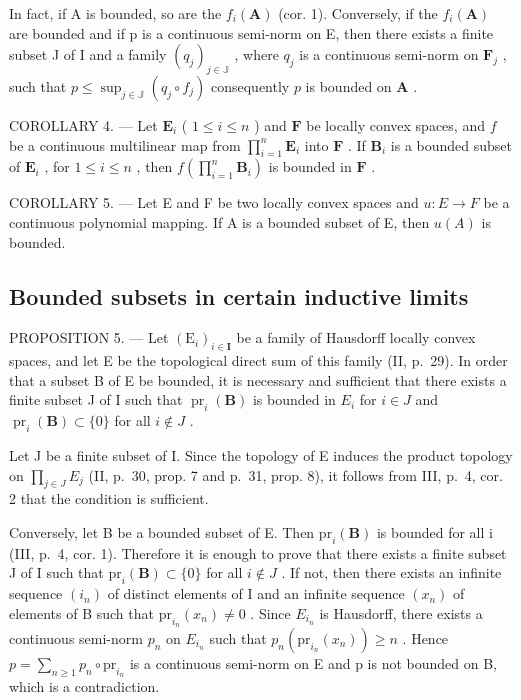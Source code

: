 In fact, if A is bounded, so are the \(f_{i}(\mathbf{A})\) (cor. 1). Conversely, if the \(f_{i}(\mathbf{A})\) are bounded and if p is a continuous semi-norm on E, then there exists a finite subset J of I and a family \((q_{j})_{j\in \mathbb{J}}\) , where \(q_{j}\) is a continuous semi-norm on \(\mathbf{F}_j\) , such that \(p\leqslant \sup_{j\in \mathbb{J}}(q_j\circ f_j)\) consequently \(p\) is bounded on \(\mathbf{A}\) .

COROLLARY 4. --- Let \(\mathbf{E}_i\) ( \(1 \leqslant i \leqslant n\) ) and \(\mathbf{F}\) be locally convex spaces, and \(f\) be a continuous multilinear map from \(\prod_{i=1}^{n} \mathbf{E}_i\) into \(\mathbf{F}\) . If \(\mathbf{B}_i\) is a bounded subset of \(\mathbf{E}_i\) , for \(1 \leqslant i \leqslant n\) , then \(f\left(\prod_{i=1}^{n} \mathbf{B}_i\right)\) is bounded in \(\mathbf{F}\) .

COROLLARY 5. --- Let E and F be two locally convex spaces and \(u:E\to F\) be a continuous polynomial mapping. If A is a bounded subset of E, then \(u(A)\) is bounded.

\subsection{Bounded subsets in certain inductive limits}

PROPOSITION 5. --- Let \((\mathrm{E}_{i})_{i\in\mathbf{I}}\) be a family of Hausdorff locally convex spaces, and let E be the topological direct sum of this family (II, p.~29). In order that a subset B of E be bounded, it is necessary and sufficient that there exists a finite subset J of I such that \(\operatorname{pr}_{i}(\mathbf{B})\) is bounded in \(E_{i}\) for \(i\in J\) and \(\operatorname{pr}_{i}(\mathbf{B})\subset\{0\}\) for all \(i\notin J\) .

Let J be a finite subset of I. Since the topology of E induces the product topology on \(\prod_{j\in J}E_{j}\) (II, p.~30, prop. 7 and p.~31, prop. 8), it follows from III, p.~4, cor. 2 that the condition is sufficient.

Conversely, let B be a bounded subset of E. Then \(\mathrm{pr}_{i}(\mathbf{B})\) is bounded for all i (III, p.~4, cor. 1). Therefore it is enough to prove that there exists a finite subset J of I such that \(\mathrm{pr}_{i}(\mathbf{B}) \subset \{0\}\) for all \(i \notin J\) . If not, then there exists an infinite sequence \((i_{n})\) of distinct elements of I and an infinite sequence \((x_{n})\) of elements of B such that \(\mathrm{pr}_{i_{n}}(x_{n}) \neq 0\) . Since \(E_{i_{n}}\) is Hausdorff, there exists a continuous semi-norm \(p_{n}\) on \(E_{i_{n}}\) such that \(p_{n}(\mathrm{pr}_{i_{n}}(x_{n})) \geqslant n\) . Hence \(p = \sum_{n \geqslant 1} p_{n} \circ \mathrm{pr}_{i_{n}}\) is a continuous semi-norm on E and p is not bounded on B, which is a contradiction.

